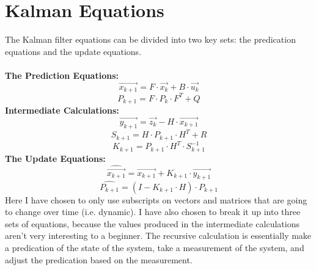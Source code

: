 \documentclass{article} %
\begin{document}
\section{Kalman Equations}
The Kalman filter equations can be divided into two key sets: the predication equations and the update equations.\\\\
\textbf{The Prediction Equations:}
\begin{equation}
\vec{x_{k+1}} = F \cdot \vec{x_k} + B \cdot \vec{u_k}
\end{equation}
\begin{equation}
P_{k+1} = F \cdot P_k \cdot F^T + Q
\end{equation}
\textbf{Intermediate Calculations:}
\begin{equation}
\vec{y_{k+1}} = \vec{z_k} - H \cdot \vec{x_{k+1}}
\end{equation}
\begin{equation}
S_{k+1} = H \cdot P_{k+1} \cdot H^T + R
\end{equation}
\begin{equation}
K_{k+1} = P_{k+1} \cdot H^T \cdot S_{k+1}^{-1}
\end{equation}
\textbf{The Update Equations:}
\begin{equation}
\hat{\vec{x_{k+1}}} = \vec{x_{k+1}} + K_{k+1} \cdot \vec{y_{k+1}}
\end{equation}
\begin{equation}
\hat{P_{k+1}} = (I - K_{k+1} \cdot H) \cdot P_{k+1}
\end{equation}
Here I have chosen to only use subscripts on vectors and matrices that are going to change over time (i.e. dynamic). I have also chosen to break it up into three sets of equations, because the values produced in the intermediate calculations aren't very interesting to a beginner. The recursive calculation is essentially make a predication of the state of the system, take a measurement of the system, and adjust the predication based on the measurement. 
\end{document}
